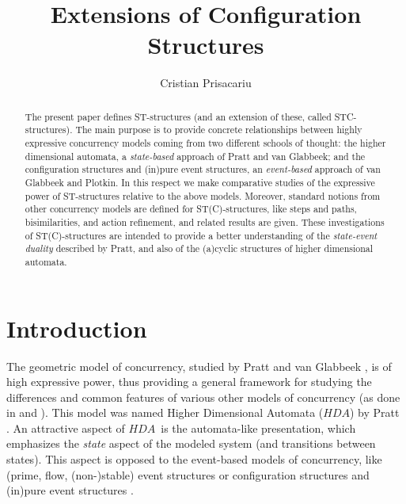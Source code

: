 \documentclass[submission,copyright,creativecommons]{eptcs}
\newcommand\HDA{\ensuremath{\mathit{HDA}}}
\begin{document}
\title{Extensions of Configuration Structures}

\author{Cristian Prisacariu
}
\def\titlerunning{Extensions of Configuration Structures}
\def\authorrunning{C.~Prisacariu
}


\maketitle


\begin{abstract}
The present paper defines ST-structures (and an extension of these, called STC-structures). The main purpose is to provide concrete relationships between highly expressive concurrency models coming from two different schools of thought: the higher dimensional automata, a \textit{state-based} approach of Pratt and van Glabbeek; and the configuration structures and (in)pure event structures, an \textit{event-based} approach of van Glabbeek and Plotkin. In this respect we make comparative studies of the expressive power of ST-structures relative to the above models. Moreover, standard notions from other concurrency models are defined for ST(C)-structures, like steps and paths, bisimilarities, and action refinement, and related results are given.
These investigations of ST(C)-structures are intended to provide a better understanding of the \textit{state-event duality} described by Pratt, and also of the (a)cyclic structures of higher dimensional automata.
\end{abstract} 

\tableofcontents


\section{Introduction}\label{sec:intro}






The geometric model of concurrency, studied by Pratt and van Glabbeek \cite{pratt91hda,Pratt00HDArev,Glabbeek06HDA}, is of high expressive power, thus providing a general framework for studying the differences and common features of various other models of concurrency (as done in \cite{Glabbeek06HDA} and \cite{Goubault12Category_Cubical}). This model was named Higher Dimensional Automata (\HDA) by Pratt \cite{pratt91hda}. An attractive aspect of \HDA\ is the automata-like presentation, which emphasizes the \textit{state} aspect of the modeled system (and transitions between states). This aspect is opposed to the event-based models of concurrency, like (prime, flow, (non-)stable) event structures \cite{NielsenPW79eventstructures,BoudolC88flowEventStruct,Winskel86} or configuration structures and (in)pure event structures \cite{GlabbeekP95config,GlabbeekP09configStruct}.
\end{document}
